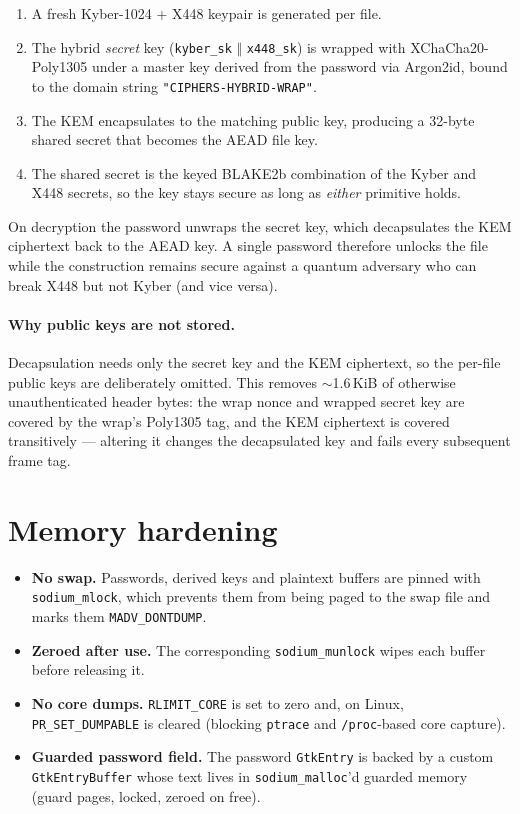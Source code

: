 \documentclass[11pt,a4paper]{article}
\newcommand{\code}[1]{\texttt{#1}}
\begin{document}
\begin{enumerate}[leftmargin=1.6em]
  \item A fresh Kyber-1024 + X448 keypair is generated per file.
  \item The hybrid \emph{secret} key (\code{kyber\_sk} $\Vert$
        \code{x448\_sk}) is wrapped with XChaCha20-Poly1305 under a master
        key derived from the password via Argon2id, bound to the domain
        string \code{"CIPHERS-HYBRID-WRAP"}.
  \item The KEM encapsulates to the matching public key, producing a 32-byte
        shared secret that becomes the AEAD file key.
  \item The shared secret is the keyed BLAKE2b combination of the Kyber and
        X448 secrets, so the key stays secure as long as \emph{either}
        primitive holds.
\end{enumerate}

On decryption the password unwraps the secret key, which decapsulates the KEM
ciphertext back to the AEAD key. A single password therefore unlocks the
file while the construction remains secure against a quantum adversary who
can break X448 but not Kyber (and vice versa).

\paragraph{Why public keys are not stored.} Decapsulation needs only the
secret key and the KEM ciphertext, so the per-file public keys are
deliberately omitted. This removes $\sim$1.6\,KiB of otherwise unauthenticated
header bytes: the wrap nonce and wrapped secret key are covered by the wrap's
Poly1305 tag, and the KEM ciphertext is covered transitively — altering it
changes the decapsulated key and fails every subsequent frame tag.

\section{Memory hardening}

\begin{itemize}[leftmargin=1.4em]
  \item \textbf{No swap.} Passwords, derived keys and plaintext buffers are
        pinned with \code{sodium\_mlock}, which prevents them from being
        paged to the swap file and marks them \code{MADV\_DONTDUMP}.
  \item \textbf{Zeroed after use.} The corresponding \code{sodium\_munlock}
        wipes each buffer before releasing it.
  \item \textbf{No core dumps.} \code{RLIMIT\_CORE} is set to zero and, on
        Linux, \code{PR\_SET\_DUMPABLE} is cleared (blocking \code{ptrace}
        and \code{/proc}-based core capture).
  \item \textbf{Guarded password field.} The password \code{GtkEntry} is
        backed by a custom \code{GtkEntryBuffer} whose text lives in
        \code{sodium\_malloc}'d guarded memory (guard pages, locked, zeroed
        on free).
\end{itemize}
\end{document}
